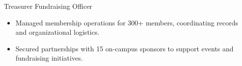 Treasurer \textbar{} Fundraising Officer
\begin{itemize}
  \item Managed membership operations for 300+ members, coordinating records and organizational logistics.
  \item Secured partnerships with 15 on-campus sponsors to support events and fundraising initiatives.
\end{itemize}


